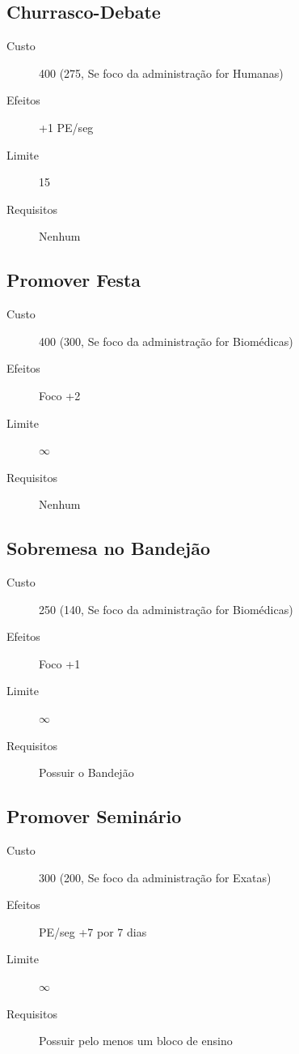 \documentclass[brazil,times]{abnt}
\begin{document}
\subsection{Churrasco-Debate}
\begin{description}
	\item[Custo] 400 (275, Se foco da administração for Humanas)
	\item[Efeitos] +1 PE/seg
	\item[Limite] 15
	\item[Requisitos] Nenhum
\end{description}

\subsection{Promover Festa}
\begin{description}
	\item[Custo] 400 (300, Se foco da administração for Biomédicas)
	\item[Efeitos] Foco +2 
	\item[Limite] $\infty$
	\item[Requisitos] Nenhum
\end{description}

\subsection{Sobremesa no Bandejão}
\begin{description}
	\item[Custo] 250 (140, Se foco da administração for Biomédicas)
	\item[Efeitos] Foco +1
	\item[Limite]  $\infty$
	\item[Requisitos] Possuir o Bandejão
\end{description}

\subsection{Promover Seminário}
\begin{description}
	\item[Custo] 300 (200, Se foco da administração for Exatas)
	\item[Efeitos] PE/seg +7 por 7 dias
	\item[Limite] $\infty$
	\item[Requisitos] Possuir pelo menos um bloco de ensino
\end{description}
\end{document}
